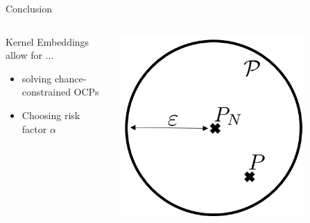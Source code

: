 \documentclass[student, noshadow, itr, english, aspectratio=169]{ITR_LSR_slides}
\begin{document}
\begin{frame}{Conclusion}
\begin{columns}[onlytextwidth, T]
\begin{column}{.6\textwidth}
			\vspace{.5cm}
			\begin{columns}
			\begin{column}{.6\textwidth}
			Kernel Embeddings allow for ...
			\begin{itemize}
				\item solving chance-constrained OCPs
				\item Choosing risk factor $\alpha$
			\end{itemize}
			\end{column}
\begin{column}{.4\textwidth}
			\includegraphics[width= \textwidth]{AmbiguitySetDrawing}
			\end{column}
			\end{columns}
		\end{column}
		\begin{column}{.4\textwidth}
			\begin{figure}
				\def\file{data/Kernel_K100_N50_Alpha01.txt}
				

\end{figure}
\end{column}
\end{columns}
\end{frame}
\end{document}
